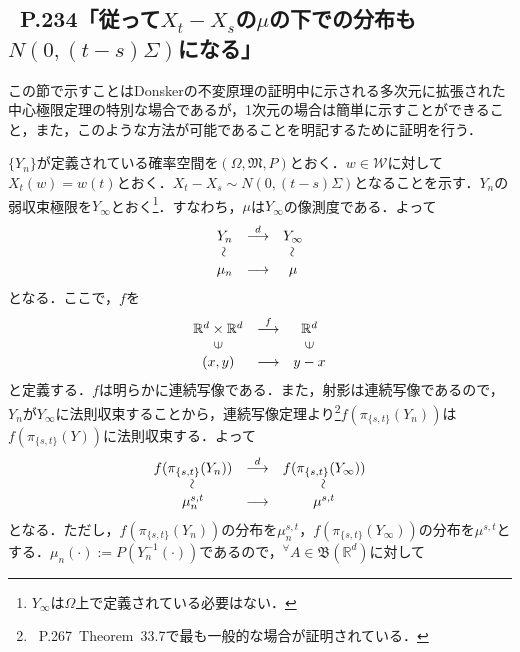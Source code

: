 \documentclass[dvipdfmx]{jsarticle}
\begin{document}
\subsection{\cite{kotani}{\ }P.234「従って$X_t-X_s$の$\mu$の下での分布も$N(0,(t-s)\Sigma)$になる」}
この節で示すことはDonskerの不変原理の証明中に示される多次元に拡張された中心極限定理の特別な場合であるが，1次元の場合は簡単に示すことができること，また，このような方法が可能であることを明記するために証明を行う．\par
$\{Y_n\}$が定義されている確率空間を$(\Omega,\mathfrak{M},P)$とおく．$w\in\mathcal{W}$に対して$X_t(w)=w(t)$とおく．$X_t-X_s\sim N(0,(t-s)\Sigma)$となることを示す．$Y_n$の弱収束極限を$Y_{\infty}$とおく\footnote{$Y_{\infty}$は$\Omega$上で定義されている必要はない．}．すなわち，$\mu$は$Y_{\infty}$の像測度である．よって
\begin{eqnarray*}
\begin{array}{ccc}
Y_n & \stackrel{d}{\longrightarrow} & Y_{\infty} \\
\rotatebox{90}{$\sim$} & & \rotatebox{90}{$\sim$} \\
\mu_n & \longrightarrow & \mu
\end{array}
\end{eqnarray*}
となる．ここで，$f$を
\begin{eqnarray*}
\begin{array}{ccc}
\mathbb{R}^d\times\mathbb{R}^d & \stackrel{f}{\longrightarrow} & \mathbb{R}^d \\
\rotatebox{90}{$\in$} & & \rotatebox{90}{$\in$} \\
(x,y) & \longrightarrow & y-x
\end{array}
\end{eqnarray*}
と定義する．$f$は明らかに連続写像である．また，射影は連続写像であるので，$Y_n$が$Y_{\infty}$に法則収束することから，連続写像定理より\footnote{\cite{kato}{\ }P.267{\ }Theorem{\ }33.7で最も一般的な場合が証明されている．}$f(\pi_{\{s,t\}}(Y_n))$は$f(\pi_{\{s,t\}}(Y))$に法則収束する．よって
\begin{eqnarray*}
\begin{array}{ccc}
f(\pi_{\{s,t\}}(Y_n)) & \stackrel{d}{\longrightarrow} & f(\pi_{\{s,t\}}(Y_{\infty})) \\
\rotatebox{90}{$\sim$} & & \rotatebox{90}{$\sim$} \\
\mu_n^{s,t} & \longrightarrow & \mu^{s,t}
\end{array}
\end{eqnarray*}
となる．ただし，$f(\pi_{\{s,t\}}(Y_n))$の分布を$\mu_n^{s,t}$，$f(\pi_{\{s,t\}}(Y_\infty))$の分布を$\mu^{s,t}$とする．$\mu_n(\cdot):=P(Y_n^{-1}(\cdot))$であるので，$^\forall A\in\mathfrak{B}(\mathbb{R}^d)$に対して
\end{document}
